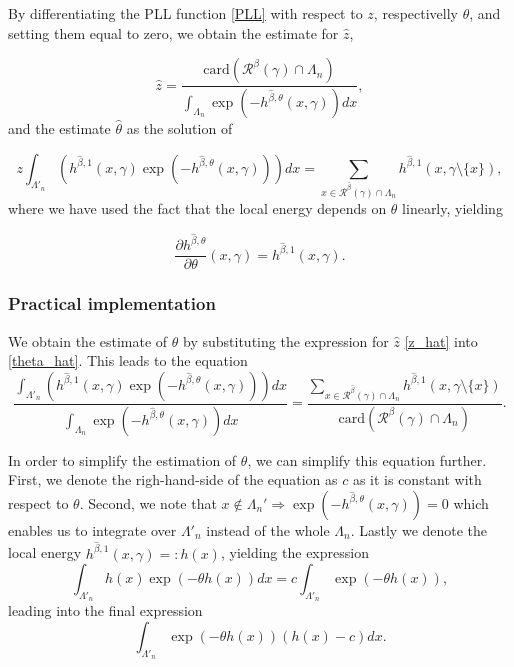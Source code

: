 By differentiating the PLL function \ref{PLL} with respect to $z$, respectivelly $\theta$, and setting them equal to zero, we obtain the estimate for $\hat z$,

\begin{equation}\label{z_hat}
\hat z = \frac{\mbox{card}(\mathcal R^\beta(\gamma)\cap \Lambda_n)}{\int_{\Lambda_n} \exp{\left( -h^{\hat\beta,\theta}(x,\gamma)\right)} dx},
\end{equation}
and the estimate $\hat\theta$ as the solution of

\begin{equation}\label{theta_hat} 
z \int_{\Lambda'_n} (h^{\hat\beta,1}(x,\gamma)\exp{\left(-h^{\hat\beta,\theta}(x,\gamma)\right)}) dx = \sum_{x \in \mathcal R^{\hat\beta}(\gamma)\cap \Lambda_n} h^{\hat\beta,1}(x,\gamma\setminus\{x\}),
\end{equation}
where we have used the fact that the local energy depends on $\theta$ linearly, yielding

$$\frac{\partial h^{\hat\beta,\theta}}{\partial \theta} (x,\gamma) = h^{\hat\beta,1}(x,\gamma).$$

\subsubsection{Practical implementation}
We obtain the estimate of $\theta$ by substituting the expression for $\hat z$ \ref{z_hat} into \ref{theta_hat}.
This leads to the equation
$$ 
\frac{\int_{\Lambda'_n} (h^{\hat\beta,1}(x,\gamma)\exp{\left(-h^{\hat\beta,\theta}(x,\gamma)\right)}) dx} {  \int_{\Lambda_n} \exp{\left( -h^{\hat\beta,\theta}(x,\gamma)\right)} dx} 
= \frac {\sum_{x \in \mathcal R^{\hat\beta}(\gamma)\cap \Lambda_n} h^{\hat\beta,1}(x,\gamma\setminus\{x\})} { \mbox{card}(\mathcal R^\beta(\gamma)\cap \Lambda_n) }. 
$$

In order to simplify the estimation of $\theta$, we can simplify this equation further. First, we denote the righ-hand-side of the equation as $c$ as it  is constant with respect to $\theta$. Second, we note that $x \notin \Lambda_n'  \Rightarrow \exp{\left(-h^{\hat\beta,\theta}(x,\gamma)\right)}= 0$ which enables us to integrate over $\Lambda'_n$ instead of the whole $\Lambda_n$. Lastly we denote the local energy $h^{\hat\beta,1}(x,\gamma) =: h(x)$, yielding the expression
$$ \int_{\Lambda'_n} h(x) \exp{\left(-\theta h(x)\right)} dx = c \int_{\Lambda'_n} \exp{\left(-\theta h(x)\right)}, $$
leading into the final expression
\begin{equation}\label{hat_theta_final} 
\int_{\Lambda'_n} \exp{\left(-\theta h(x)\right)} (h(x) - c) dx .
\end{equation}


